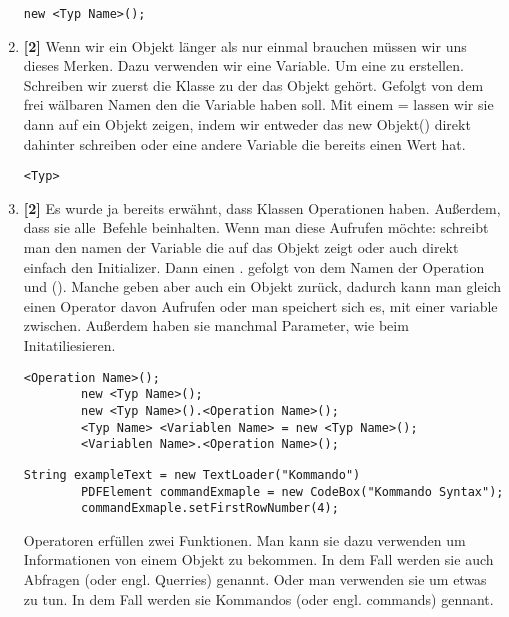 \begin{enumerate}
\begin{lstlisting}[title=\textbf{Konstruktor Syntax},firstnumber=5]
        new <Typ Name>();
    \end{lstlisting}
    \item \textbf{[2]} Wenn wir ein Objekt länger als nur einmal brauchen müssen wir uns dieses Merken. Dazu verwenden wir eine Variable. Um eine zu erstellen. Schreiben wir zuerst die Klasse zu der das Objekt gehört. Gefolgt von dem frei wälbaren Namen den die Variable haben soll. Mit einem = lassen wir sie dann auf ein Objekt zeigen, indem wir entweder das new Objekt() direkt dahinter schreiben oder eine andere
          Variable die bereits einen Wert hat.
          \begin{lstlisting}[title=\textbf{Variablen Syntax}]
    <Typ>
          \end{lstlisting}
    \item \textbf{[2]} Es wurde ja bereits erwähnt, dass Klassen Operationen haben. Außerdem, dass sie \glqq alle\grqq\ Befehle beinhalten. Wenn man diese Aufrufen möchte: schreibt man den namen der Variable die auf das Objekt zeigt oder auch direkt einfach den Initializer. Dann einen . gefolgt von dem Namen der Operation und (). Manche geben aber auch ein Objekt zurück, dadurch kann man gleich einen Operator davon Aufrufen oder man speichert sich es, mit einer variable zwischen. Außerdem haben sie manchmal Parameter, wie beim Initatiliesieren.
          \begin{lstlisting}[title=\textbf{Kommando Syntax},firstnumber=4]
        <Operation Name>();
        new <Typ Name>();
        new <Typ Name>().<Operation Name>();
        <Typ Name> <Variablen Name> = new <Typ Name>();
        <Variablen Name>.<Operation Name>();
            \end{lstlisting}
          \begin{lstlisting}[title=\textbf{Kommando Beispiel},firstnumber=4]
        String exampleText = new TextLoader("Kommando")
        PDFElement commandExmaple = new CodeBox("Kommando Syntax");
        commandExmaple.setFirstRowNumber(4);
              \end{lstlisting}
          \begin{Infobox}[Operationen]
              Operatoren erfüllen zwei Funktionen. Man kann sie dazu verwenden um Informationen von einem Objekt zu bekommen.
              In dem Fall werden sie auch Abfragen (oder engl. Querries) genannt.
              Oder man verwenden sie um etwas zu tun. In dem Fall werden sie Kommandos (oder engl. commands) gennant.
          \end{Infobox}


\end{enumerate}

